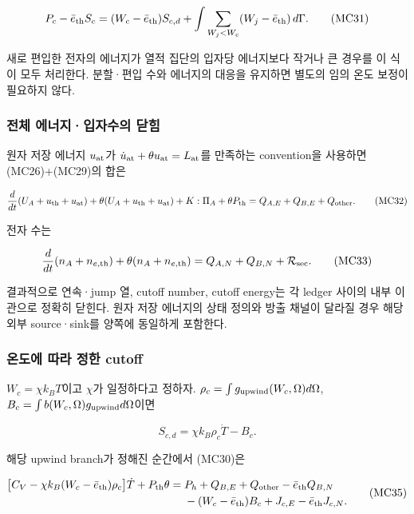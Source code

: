 \documentclass[11pt,a4paper]{article}
\begin{document}
\[
P_c-\bar e_{\rm th}S_c
=(W_c-\bar e_{\rm th})S_{c,d}
+\int\sum_{W_j<W_c}(W_j-\bar e_{\rm th})\,d\Gamma.
\tag{MC31}
\]

새로 편입한 전자의 에너지가 열적 집단의 입자당 에너지보다 작거나 큰 경우를 이 식이 모두 처리한다. 분할·편입 수와 에너지의 대응을 유지하면 별도의 임의 온도 보정이 필요하지 않다.

\hypertarget{uxc804uxccb4-uxc5d0uxb108uxc9c0uxc785uxc790uxc218uxc758-uxb2ebuxd798}{%
\subsubsection{전체 에너지·입자수의 닫힘}\label{uxc804uxccb4-uxc5d0uxb108uxc9c0uxc785uxc790uxc218uxc758-uxb2ebuxd798}}

원자 저장 에너지 \(u_{\rm at}\)가 \(\dot u_{\rm at}+\theta u_{\rm at}=L_{\rm at}\)를 만족하는 convention을 사용하면 (MC26)+(MC29)의 합은

\[
\frac d{dt}(U_A+u_{\rm th}+u_{\rm at})
+\theta(U_A+u_{\rm th}+u_{\rm at})
+K:\Pi_A+\theta P_{\rm th}
=Q_{A,E}+Q_{B,E}+Q_{\rm other}.
\tag{MC32}
\]

전자 수는

\[
\frac d{dt}(n_A+n_{e,\rm th})
+\theta(n_A+n_{e,\rm th})
=Q_{A,N}+Q_{B,N}+\mathcal R_{\rm sec}.
\tag{MC33}
\]

결과적으로 연속·jump 열, cutoff number, cutoff energy는 각 ledger 사이의 내부 이관으로 정확히 닫힌다. 원자 저장 에너지의 상태 정의와 방출 채널이 달라질 경우 해당 외부 source·sink를 양쪽에 동일하게 포함한다.

\hypertarget{uxc628uxb3c4uxc5d0-uxb530uxb77c-uxc815uxd55c-cutoff}{%
\subsubsection{온도에 따라 정한 cutoff}\label{uxc628uxb3c4uxc5d0-uxb530uxb77c-uxc815uxd55c-cutoff}}

\(W_c=\chi k_BT\)이고 \(\chi\)가 일정하다고 정하자. \(\rho_c=\int g_{\rm upwind}(W_c,\Omega)d\Omega\), \(B_c=\int b(W_c,\Omega)g_{\rm upwind}d\Omega\)이면

\[
S_{c,d}=\chi k_B\rho_c\dot T-B_c.
\tag{MC34}
\]

해당 upwind branch가 정해진 순간에서 (MC30)은

\[
\begin{split}
\big[C_V-\chi k_B(W_c-\bar e_{\rm th})\rho_c\big]\dot T
+P_{\rm th}\theta
={}&P_h+Q_{B,E}+Q_{\rm other}-\bar e_{\rm th}Q_{B,N}\\
&-(W_c-\bar e_{\rm th})B_c
+J_{c,E}-\bar e_{\rm th}J_{c,N}.
\end{split}
\tag{MC35}
\]
\end{document}
